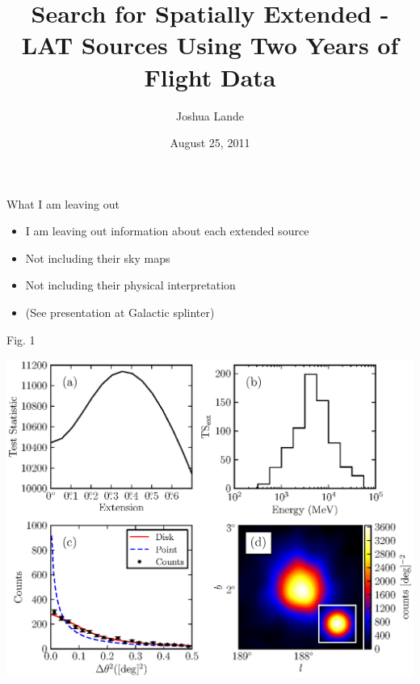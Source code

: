 \documentclass[12pt]{beamer}
\title{Search for Spatially Extended \fermi-LAT Sources Using Two Years of Flight
Data}
\author{Joshua Lande}
\institute{SLAC/Stanford}
\date{August 25, 2011}
\begin{document}


\begin{frame}{What I am leaving out}
  \begin{itemize}
  \item I am leaving out information about each extended source
  \item Not including their sky maps
  \item Not including their physical interpretation
  \item (See presentation at Galactic splinter)
  \end{itemize}
\end{frame}

\begin{frame}{Fig. 1}
  \begin{center}
    \includegraphics[scale=0.5]{../paper/ic443_plots/four_plots_ic443_color.eps}
  \end{center}
\end{frame}
\end{document}
